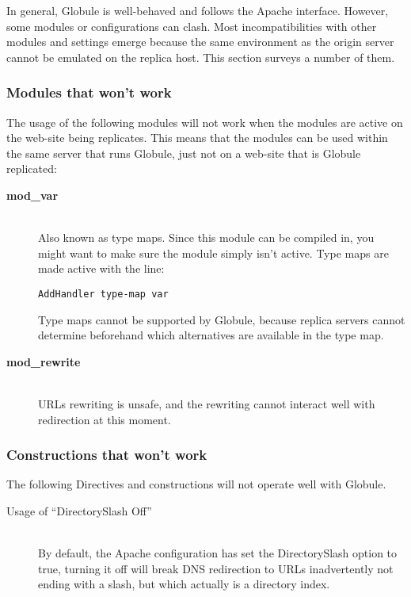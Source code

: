 \documentclass[10pt,a4paper]{article}
\makeatletter
\newenvironment{p}{\@open{P}{}}{\@close{P}}
\newenvironment{p}{}{\par}
\makeatother
\begin{document}
\begin{p}
In general, Globule is well-behaved and follows the Apache interface. However,
some modules or configurations can clash.  Most incompatibilities with other
modules and settings emerge because the same environment as the origin server
cannot be emulated on the replica host. This section surveys a number of them.
\end{p}

\subsubsection{Modules that won't work}

\begin{p}
The usage of the following modules will not work when the modules are active
on the web-site being replicates.  This means that the modules can be used
within the same server that runs Globule, just not on a web-site that is
Globule replicated:
\end{p}

\begin{p}
\begin{description}
\item[\textbf{mod\_var}]~\\
Also known as type maps.  Since this module can be compiled in, you might want
to make sure the module simply isn't active.  Type maps are made active with
the line:
\begin{Verbatim}
AddHandler type-map var
\end{Verbatim}
Type maps cannot be supported by Globule, because replica servers cannot
determine beforehand which alternatives are available in the type map.
\item[\textbf{mod\_rewrite}]~\\
URLs rewriting is unsafe, and the rewriting cannot interact well with
redirection at this moment.
\end{description}
\end{p}

\subsubsection{Constructions that won't work}

\begin{p}
The following Directives and constructions will not operate well with Globule.
\end{p}

\begin{p}
\begin{description}
\item[Usage of ``DirectorySlash Off'']~\\
By default, the Apache configuration has set the DirectorySlash option to
true, turning it off will break DNS redirection to URLs inadvertently not
ending with a slash, but which actually is a directory index.
\end{description}
\end{p}
\end{document}

